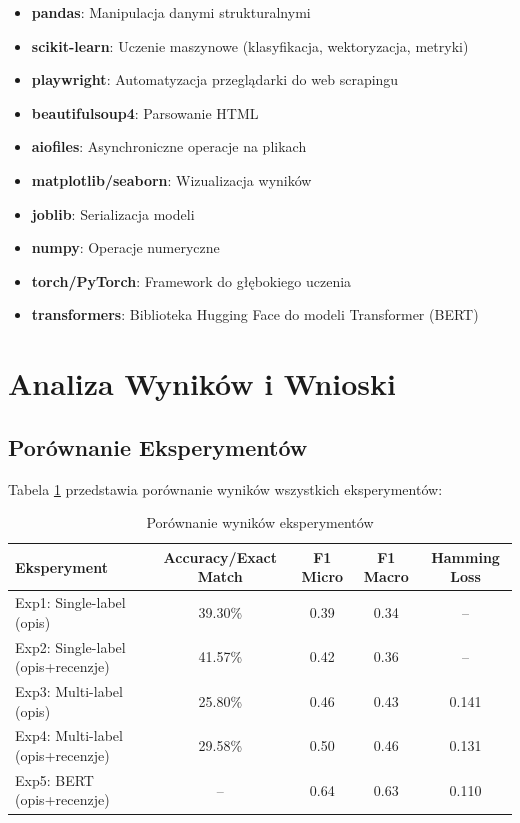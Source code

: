 \documentclass[12pt,a4paper]{article}
\begin{document}
\begin{itemize}
    \item \textbf{pandas}: Manipulacja danymi strukturalnymi
    \item \textbf{scikit-learn}: Uczenie maszynowe (klasyfikacja, wektoryzacja, metryki)
    \item \textbf{playwright}: Automatyzacja przeglądarki do web scrapingu
    \item \textbf{beautifulsoup4}: Parsowanie HTML
    \item \textbf{aiofiles}: Asynchroniczne operacje na plikach
    \item \textbf{matplotlib/seaborn}: Wizualizacja wyników
    \item \textbf{joblib}: Serializacja modeli
    \item \textbf{numpy}: Operacje numeryczne
    \item \textbf{torch/PyTorch}: Framework do głębokiego uczenia
    \item \textbf{transformers}: Biblioteka Hugging Face do modeli Transformer (BERT)
\end{itemize}

\section{Analiza Wyników i Wnioski}

\subsection{Porównanie Eksperymentów}

Tabela \ref{tab:wyniki} przedstawia porównanie wyników wszystkich eksperymentów:

\begin{table}[h]
\centering
\begin{tabular}{lcccc}
\toprule
\textbf{Eksperyment} & \textbf{Accuracy/Exact Match} & \textbf{F1 Micro} & \textbf{F1 Macro} & \textbf{Hamming Loss} \\
\midrule
Exp1: Single-label (opis) & 39.30\% & 0.39 & 0.34 & -- \\
Exp2: Single-label (opis+recenzje) & 41.57\% & 0.42 & 0.36 & -- \\
Exp3: Multi-label (opis) & 25.80\% & 0.46 & 0.43 & 0.141 \\
Exp4: Multi-label (opis+recenzje) & 29.58\% & 0.50 & 0.46 & 0.131 \\
Exp5: BERT (opis+recenzje) & -- & 0.64 & 0.63 & 0.110 \\
\bottomrule
\end{tabular}
\caption{Porównanie wyników eksperymentów}
\label{tab:wyniki}
\end{table}
\end{document}
